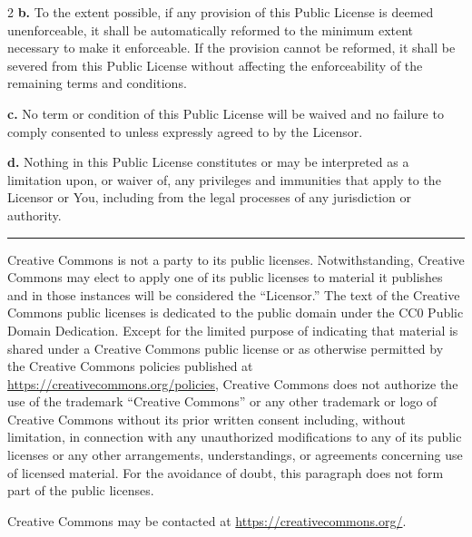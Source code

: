 \begin{multicols*}{2}
    \textbf{b.} To the extent possible, if any provision of this Public License
    is deemed unenforceable, it shall be automatically reformed to the
    minimum extent necessary to make it enforceable. If the provision
    cannot be reformed, it shall be severed from this Public License
    without affecting the enforceability of the remaining terms and
    conditions.

    \textbf{c.} No term or condition of this Public License will be waived and
    no failure to comply consented to unless expressly agreed to by the
    Licensor.

    \textbf{d.} Nothing in this Public License constitutes or may be interpreted
    as a limitation upon, or waiver of, any privileges and immunities that
    apply to the Licensor or You, including from the legal processes of any
    jurisdiction or authority.

    \noindent\rule{\linewidth}{0.4pt}

    Creative Commons is not a party to its public licenses. Notwithstanding,
    Creative Commons may elect to apply one of its public licenses to
    material it publishes and in those instances will be considered the
    ``Licensor.'' The text of the Creative Commons public licenses is
    dedicated to the public domain under the CC0 Public Domain Dedication.
    Except for the limited purpose of indicating that material is shared
    under a Creative Commons public license or as otherwise permitted by
    the Creative Commons policies published at
    \url{https://creativecommons.org/policies}, Creative Commons does not
    authorize the use of the trademark ``Creative Commons'' or any other
    trademark or logo of Creative Commons without its prior written consent
    including, without limitation, in connection with any unauthorized
    modifications to any of its public licenses or any other arrangements,
    understandings, or agreements concerning use of licensed material. For
    the avoidance of doubt, this paragraph does not form part of the public
    licenses.

    Creative Commons may be contacted at
    \url{https://creativecommons.org/}.

\end{multicols*}

